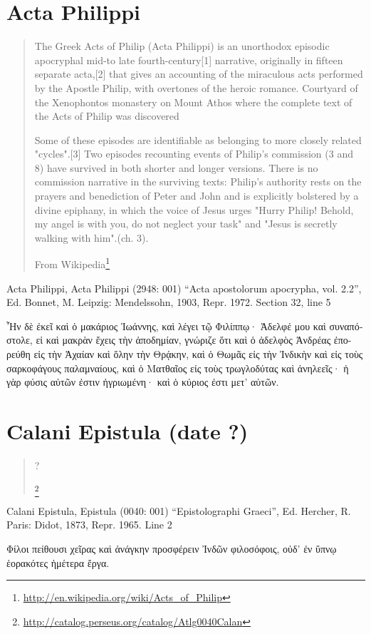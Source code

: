 \documentclass[12pt,letterpaper,twoside,final]{memoir}
\begin{document}
\section{Acta Philippi}
\blockquote[From Wikipedia\footnote{\url{http://en.wikipedia.org/wiki/Acts_of_Philip}}]{The Greek Acts of Philip (Acta Philippi) is an unorthodox episodic apocryphal mid-to late fourth-century[1] narrative, originally in fifteen separate acta,[2] that gives an accounting of the miraculous acts performed by the Apostle Philip, with overtones of the heroic romance.
Courtyard of the Xenophontos monastery on Mount Athos where the complete text of the Acts of Philip was discovered

Some of these episodes are identifiable as belonging to more closely related "cycles".[3] Two episodes recounting events of Philip's commission (3 and 8) have survived in both shorter and longer versions. There is no commission narrative in the surviving texts: Philip's authority rests on the prayers and benediction of Peter and John and is explicitly bolstered by a divine epiphany, in which the voice of Jesus urges "Hurry Philip! Behold, my angel is with you, do not neglect your task" and "Jesus is secretly walking with him".(ch. 3).

}
\begin{greek}
Acta Philippi, Acta Philippi (2948: 001)
“Acta apostolorum apocrypha, vol. 2.2”, Ed. Bonnet, M.
Leipzig: Mendelssohn, 1903, Repr. 1972.
Section 32, line 5

Ἦν δὲ ἐκεῖ καὶ ὁ μακάριος Ἰωάννης, καὶ λέγει τῷ 
Φιλίππῳ· Ἀδελφέ μου καὶ συναπόστολε, εἰ καὶ μακρὰν ἔχεις 
τὴν ἀποδημίαν, γνώριζε ὅτι καὶ ὁ ἀδελφὸς Ἀνδρέας ἐπο-
ρεύθη εἰς τὴν Ἀχαίαν καὶ ὅλην τὴν Θρᾴκην, καὶ ὁ Θωμᾶς 
εἰς τὴν Ἰνδικὴν καὶ εἰς τοὺς σαρκοφάγους παλαμναίους, καὶ 
ὁ Ματθαῖος εἰς τοὺς τρωγλοδύτας καὶ ἀνηλεεῖς· ἡ γὰρ 
φύσις αὐτῶν ἐστιν ἠγριωμένη· καὶ ὁ κύριος ἐστι μετ' αὐτῶν. 

\end{greek}

\section{Calani Epistula (date ?)}
\blockquote[\footnote{\url{http://catalog.perseus.org/catalog/Atlg0040Calan}}]{?}
\begin{greek}


Calani Epistula, Epistula (0040: 001)
“Epistolographi Graeci”, Ed. Hercher, R.
Paris: Didot, 1873, Repr. 1965.
Line 2

Φίλοι πείθουσι χεῖρας καὶ ἀνάγκην προσφέρειν 
Ἰνδῶν φιλοσόφοις, οὐδ' ἐν ὕπνῳ ἑορακότες ἡμέτερα 
ἔργα. 

\end{greek}
\end{document}
